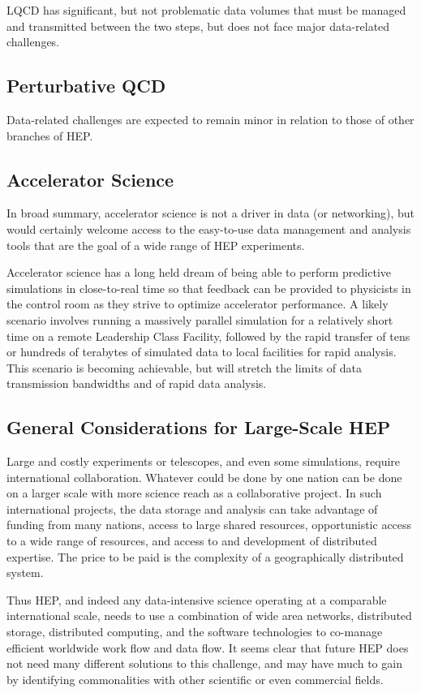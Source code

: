 LQCD has significant, but not problematic data volumes that must be managed and transmitted between the two steps, but does not face major data-related challenges.

\subsection{Perturbative QCD}
Data-related challenges are expected to remain minor in relation to those of other branches of HEP.

\subsection{Accelerator Science}
In broad summary, accelerator science is not a driver in data (or networking), but would certainly welcome access to the easy-to-use data management and analysis tools that are the goal of a wide range of HEP experiments.

Accelerator science has a long held dream of being able to perform predictive simulations in close-to-real time so that feedback can be provided to physicists in the control room as they strive to optimize accelerator performance.  A likely scenario involves running a massively parallel simulation for a relatively short time on a remote Leadership Class Facility, followed by the rapid transfer of tens or hundreds of terabytes of simulated data to local facilities for rapid analysis.  This scenario is becoming achievable, but will stretch the limits of data transmission bandwidths and of rapid data analysis.

\subsection{General Considerations for Large-Scale HEP}
Large and costly experiments or telescopes, and even some simulations, require international collaboration.  Whatever could be done by one nation can be done on a larger scale with more science reach as a collaborative project.  In such international projects, the data storage and analysis can take advantage of funding from many nations, access to large shared resources, opportunistic access to a wide range of resources, and access to and development of distributed expertise.  The price to be paid is the complexity of a geographically distributed system.

Thus HEP, and indeed any data-intensive science operating at a comparable international scale, needs to use a combination of wide area networks, distributed storage, distributed computing, and the software technologies to co-manage efficient worldwide work flow and data flow.  It seems clear that future HEP does not need many different solutions to this challenge, and may have much to gain by identifying commonalities with other scientific or even commercial fields.

